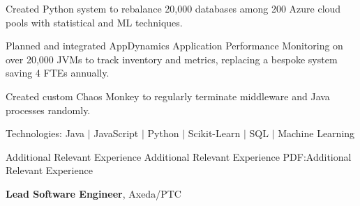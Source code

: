 \documentclass[letterpaper,MMMMyyyy,nonstopmode]{simpleresumecv}
\newcommand{\tech}[1]{\textrm{Technologies:} #1}
\newcommand{\comment}[1]{\ignorespaces} %
\newif\ifLOCATION
\begin{document}
\begin{Body}
\ifLOCATION
\hfill
Rochester, New York
\fi

\Gap
\begin{Detail}
\iffalse
At Paychex I worked with multiple cross-functional teams to build: an inventory system to track hosts, JVMs, and databases; machine learning systems in Python to efficiently rebalance databases and predict system utilization; custom Chaos Monkey ro randomly terminate process to find configuration weaknesses; and implemented AppDynamics on over 20,000 JVMs.
\fi

\iftrue
\BulletItem
Created Python system to rebalance 20,000 databases among 200 Azure cloud pools with statistical and ML techniques.


\BulletItem
Planned and integrated AppDynamics Application Performance Monitoring on over 20,000 JVMs to track inventory and metrics, replacing a bespoke system saving 4 FTEs annually.

\BulletItem
Created custom Chaos Monkey to regularly terminate middleware and Java processes randomly. 

\tech{Java $|$ JavaScript $|$ Python $|$ Scikit-Learn $|$ \comment{TensorFlow $|$} SQL \comment{$|$ AppDynamics} $|$ Machine Learning}
\fi

\end{Detail}

\BigGap

\Section
{Additional Relevant Experience}
{Additional Relevant Experience}
{PDF:Additional Relevant Experience}

\Entry
\textbf{Lead Software Engineer}, Axeda/PTC
\hfill 

\ifLOCATION
\hfill
Rochester, New York
\fi



\end{Body}
\end{document}
